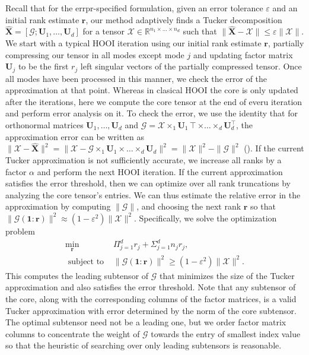     Recall that for the errpr-specified formulation, given an error tolerance
    $\varepsilon$ and an initial rank estimate $\mathbf{r}$, our method adaptively
    finds a Tucker decomposition $\mathbf{\hat{X}} = [\mathcal{G}; \mathbf{U}_{1}, \dots,
    \mathbf{U}_{d}]$ for a tensor $\mathcal{X} \in \mathbb{R}^{n_1 \times \dots \times
    n_d}$ such that $\| \mathbf{\hat{X}} - \mathcal{X} \| \leq \varepsilon \| \mathcal{X} \|$.
    We start with a typical HOOI iteration using our initial rank estimate
    $\mathbf{r}$, partially compressing our tensor in all modes except mode $j$ and
    updating factor matrix $\mathbf{U}_{j}$ to be the first $r_j$ left singular
    vectors of the partially compressed tensor. Once all modes have been
    processed in this manner, we check the error of the approximation at that
    point. 
    Whereas in clasical HOOI the core is only updated after the iterations, here
    we compute the core tensor at the end of everu iteration and perform error
    analysis on it. To check the error, we use the identity that for orthonormal
    matrices $\mathbf{U}_{1},\dots,\mathbf{U}_{d}$ and $\mathcal{G} = \mathcal{X} \times_1
    \mathbf{U}_{1}\intercal \times \dots \times_d \mathbf{U}_{d}^\intercal$, the approximation error can be
    written as $\| \mathcal{X} - \mathbf{\hat{X}} \|^2 = \| \mathcal{X} - \mathcal{G} \times_1
    \mathbf{U}_{1} \times \dots \times_d \mathbf{U}_{d} \|^2 = \| \mathcal{X} \|^2 - \| \mathcal{G}
    \|^2$ (\cite[Proposition 6.3]{BK25}). If the current Tucker approximation is
    not sufficiently accurate, we increase all ranks by a factor $\alpha$ and
    perform the next HOOI iteration. If the current approximation satisfies the
    error threshold, then we can optimize over all rank truncations by analyzing
    the core tensor's entries.
    We can thus estimate the relative error in the approximation by computing
    $\| \mathcal{G} \|$, and choosing the next rank $\mathbf{r}$ so that $\|
    \mathcal{G}(\mathbf{1}:\mathbf{r})\|^2 \approx (1 - \varepsilon^2) \| \mathcal{X} \|^2.$ 
    Specifically, we solve the optimization problem
    \begin{equation}\label{eq:rankcond}
    \begin{aligned}
    \min_{\mathbf{r}}  \quad & \Pi_{j=1}^d r_j + \Sigma_{j=1}^{d} n_j r_j,\\ 
    \text{ subject to } &\|\mathcal{G}(\mathbf{1}:\mathbf{r}) \|^2 \geq (1 - \varepsilon^2) \| \mathcal{X} \|^2.
    \end{aligned}
    \end{equation}
    This computes the leading subtensor of $\mathcal{G}$ that minimizes the size of
    the Tucker approximation and also satisfies the error threshold. Note that
    any subtensor of the core, along with the corresponding columns of the
    factor matrices, is a valid Tucker approximation with error determined by
    the norm of the core subtensor. The optimal subtensor need not be a leading
    one, but we order factor matrix columns to concentrate the weight of
    $\mathcal{G}$ towards the entry of smallest index value so that the heuristic of
    searching over only leading subtensors is reasonable.

